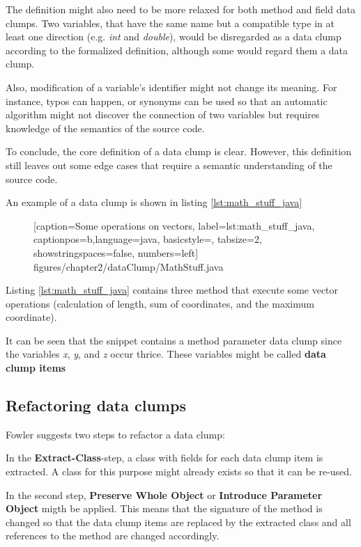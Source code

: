 The definition might also need to be more relaxed for both method and field data clumps. Two variables, that have the same name but a compatible type in at least one direction  (e.g. \textit{int} and  \textit{double}), would be disregarded as a data clump according to the formalized definition, although some would regard them a data clump.

Also, modification of a variable's identifier might not change its meaning. For instance, typos can happen, or synonyms can be used so that an automatic algorithm might not discover the connection of two variables but requires  knowledge of the semantics of the source code. \cite{zhangImprovingPrecisionFowler2008}


To conclude, the core definition of a data clump is clear. However, this definition still leaves out some edge cases that require a semantic understanding of the source code. 

An example of a data clump is shown in listing \ref{lst:math_stuff_java}
\begin{figure} [htbp!]
			
			[caption={Some operations on vectors},
			label={lst:math_stuff_java},
			captionpos=b,language=java, basicstyle=\footnotesize, tabsize=2, showstringspaces=false,  numbers=left]
			{figures/chapter2/dataClump/MathStuff.java}
		\end{figure}



Listing \ref{lst:math_stuff_java} contains three method that execute some vector operations (calculation of length, sum of coordinates, and the maximum coordinate). 


It can be seen that  the snippet contains a method parameter data clump since the variables \textit{x}, \textit{y}, and  \textit{z} occur thrice.  These variables might be called \textbf{data clump items}
  
\subsection{Refactoring data clumps}
Fowler suggests two  steps to refactor a data clump:

In the  \textbf{Extract-Class}-step, a class with fields for each data clump item is extracted. A class for this purpose might already exists  so that it can be re-used.

In the second step, \textbf{Preserve Whole Object} or \textbf{Introduce Parameter Object} migth be applied. This means that the signature of the method is changed so that the data clump items are replaced by the extracted class and all references to the method are changed accordingly.


